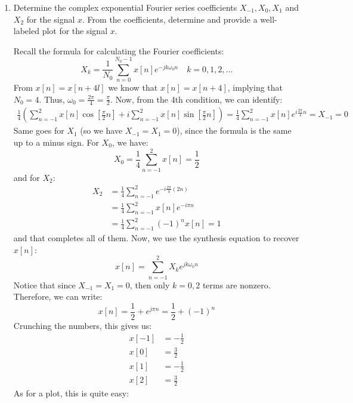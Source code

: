 \documentclass[10pt]{article}
\begin{document}
	\begin{enumerate}[label=\alph*)]
		\item Determine the complex exponential Fourier series coefficients \( X_{-1}, X_0, X_1 \) and 
			\( X_2 \) for the signal \( x \). From the coefficients, determine and provide a well-labeled
			plot for the signal \( x \). 

			\begin{solution}
				Recall the formula for calculating the Fourier coefficients:
				\[
					X_k = \frac{1}{N_0}\sum_{n=0}^{N_0-1} x[n] e^{-j k \omega_0 n} \quad k = 0, 1, 2, \dots
				\]  
				From \( x[n] = x[n + 4l] \) we know that \( x[n] = x[n + 4] \), implying that 
				\( N_0 = 4 \). Thus, \( \omega_0 = \frac{2\pi}{4} = \frac{\pi}{2} \). Now, from the 4th condition, we 
				can identify:
				\begin{align*}
					\frac{1}{4}\left(\sum_{n=-1}^{2} x[n] \cos\left[ \frac{\pi}{2}n \right] + 
					i \sum_{n=-1}^{2} x[n] \sin\left[ \frac{\pi}{2}n \right]\right) = \frac{1}{4}\sum_{n=-1}^{2} x[n]
					e^{i \frac{2\pi}{4} n} = X_{-1} = 0
				\end{align*}
				Same goes for \( X_1 \) (so we have \( X_{-1} = X_1 = 0 \)), 
				since the formula is the same up to a minus sign. For \( X_0 \), we have:
				\[
					X_0 = \frac{1}{4}\sum_{n=-1}^{2} x[n] = \frac{1}{2}
				\] 
				and for \( X_2 \):
				\begin{align*}
					X_2 &=\frac{1}{4} \sum_{n=-1}^{2} e^{-i \frac{2\pi}{4} (2n)}\\
						&= \frac{1}{4}\sum_{n=-1}^{2} x[n] e^{-i \pi n} \\
						&=\frac{1}{4} \sum_{n=-1}^{2} (-1)^{n}x[n] = 1
				\end{align*}
				and that completes all of them. Now, we use the synthesis equation to recover \( x[n] \):
				\[
					x[n] = \sum_{n=-1}^{2} X_k e^{j k \omega_0 n}
				\] 
				Notice that since \( X_{-1} = X_1 = 0 \), then only \( k = 0, 2 \) terms are nonzero. Therefore, 
				we can write:
				\[
					x[n] = \frac{1}{2} + e^{j \pi n} = \frac{1}{2} + (-1)^{n}
				\] 
				Crunching the numbers, this gives us:
				\begin{align*}
					x[-1] &= -\frac{1}{2} \\
					x[0] &= \frac{3}{2} \\
					x[1] &=  -\frac{1}{2} \\
					x[2] &= \frac{3}{2} 
				\end{align*}
				As for a plot, this is quite easy:
				\begin{center}

\end{center}
\end{solution}
\end{enumerate}
\end{document}
